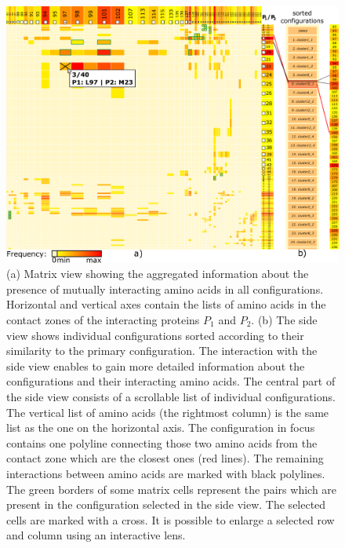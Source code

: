 \documentclass[twocolumn]{bmcart}%
\def\MatView {Matrix view\xspace}
\begin{document}
\begin{figure}[tb]
  \centering
  \includegraphics[width=0.95\columnwidth]{images/figure4.pdf}
  \caption{
  (a) \MatView showing the aggregated information about the presence of mutually interacting amino acids in all configurations. Horizontal and vertical axes contain the lists of amino acids in the contact zones of the interacting proteins $P_1$ and $P_2$. (b) The side view shows individual configurations sorted according to their similarity to the primary configuration. The interaction with the side view enables to gain more detailed information about the configurations and their interacting amino acids. The central part of the side view consists of a scrollable list of individual configurations. The vertical list of amino acids (the rightmost column) is the same list as the one on the horizontal axis. The configuration in focus contains one polyline connecting those two amino acids from the contact zone which are the closest ones (red lines). The remaining interactions between amino acids are marked with black polylines. The green borders of some matrix cells represent the pairs which are present in the configuration selected in the side view. The selected cells are marked with a cross. It is possible to enlarge a selected row and column using an interactive lens.}
  \label{fig:matrixlens}
\end{figure}
\end{document}
